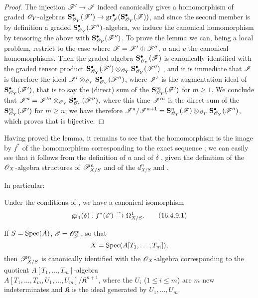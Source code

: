 \begin{proof}
The injection $\sh{F}' \to \sh{I}$ indeed canonically gives a homomorphism of graded $\mathscr{O}_Y$-algebras $\bb{S}_{\sh{O}_Y}^\bullet(\sh{F}') \to \gr_\sh{I}^\bullet(\bb{S}_{\sh{O}_Y}^\bullet(\sh{F}))$, and since the second member is by definition a graded $\mathbf{S}_{\mathscr{O}_Y}^\bullet(\mathscr{F}'')$-algebra, we induce the canonical homomorphism  by tensoring the above with $\mathbf{S}_{\mathscr{O}_Y}^\bullet(\mathscr{F}'')$.
To prove the lemma we can, being a local problem, restrict to the case where $\mathscr{F} = \mathscr{F}' \oplus \mathscr{F}''$, $u$ and $v$ the canonical homomorphisms.
Then the graded algebra $\mathbf{S}_{\mathscr{O}_Y}^\bullet(\mathscr{F})$ is canonically identified with the graded tensor product $\mathbf{S}_{\mathscr{O}_Y}^\bullet(\mathscr{F}') \otimes_{\mathscr{O}_Y} \mathbf{S}_{\mathscr{O}_Y}^\bullet(\mathscr{F}'')$ , and it is immediate that $\mathscr{I}$ is therefore the ideal $\mathscr{I}' \otimes_{\mathscr{O}_Y} \mathbf{S}_{\mathscr{O}_Y}^\bullet(\mathscr{F}'')$, where $\mathscr{I}'$ is the augmentation ideal of $\mathbf{S}_{\mathscr{O}_Y}^\bullet(\mathscr{F}')$, that is to say the (direct) sum of the $\mathbf{S}_{\mathscr{O}_Y}^m(\mathscr{F}')$ for $m \geq 1$.
We conclude that $\mathscr{I}^n = \mathscr{I}'^n \otimes_{\mathscr{O}_Y} \mathbf{S}_{\mathscr{O}_Y}^\bullet(\mathscr{F}'')$, where this time $\mathscr{I}'^n$ is the direct sum of the $\mathbf{S}_{\mathscr{O}_Y}^m(\mathscr{F}')$ for $m \geq n$;
we have therefore $\mathscr{I}^n/\mathscr{I}^{n+1} = \mathbf{S}_{\mathscr{O}_Y}^n(\mathscr{F}) \otimes_{\mathscr{O}_Y} \mathbf{S}_{\mathscr{O}_Y}^\bullet(\mathscr{F}'')$, which proves that  is bijective.
\end{proof}

Having proved the lemma, it remains to see that the homomorphism  is the image by $f^*$ of the homomorphism  corresponding to the exact sequence ;
we can easily see that it follows from the definition of $u$  and of $\delta$ , given the definition of the $\mathscr{O}_X$-algebra structures of $\mathscr{P}_{X/S}^n$ and of the $d_{X/S}^n$  and .

In particular:

\begin{corollary}[16.4.9]
\label{IV.16.4.9}
Under the conditions of , we have a canonical isomorphism
\[
\label{IV.16.4.9.1}
  \operatorname{gr}_1(\delta): f^*(\mathscr{E}) \xrightarrow{\sim} \Omega_{X/S}^1.
  \tag{16.4.9.1}
\]
\end{corollary}

\begin{corollary}[16.4.10]
\label{IV.16.4.10}
If $S = \operatorname{Spec}(A)$, $\mathscr{E} = \mathscr{O}_S^m$, so that
\[
  X = \operatorname{Spec}(A[T_1, \dots, T_m]),
\]
then $\mathscr{P}_{X/S}^n$ is canonically identified with the $\mathscr{O}_X$-algebra corresponding to the quotient $A[T_1, \dots, T_m]$-algebra\\
$A[T_1, \dots, T_m, U_1, \dots, U_m]/\mathfrak{K}^{n+1}$, where the $U_i$ ($1 \leq i \leq m$) are $m$ new indeterminates and $\mathfrak{K}$ is the ideal generated by $U_1, \dots, U_m$.
\end{corollary}

